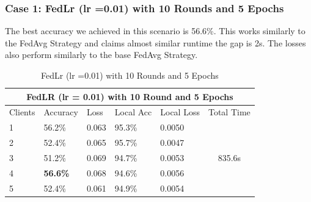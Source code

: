\documentclass[conference]{IEEEtran}
\begin{document}
 \subsubsection{Case 1: FedLr (lr =0.01) with 10 Rounds and 5 Epochs}
 
 The best accuracy we achieved in this scenario is 56.6\%. This works similarly to the FedAvg Strategy and claims almost similar runtime the gap is 2s. The losses also perform similarly to the base FedAvg Strategy. 
 \begin{table}[ht]
 	\centering
 	\caption{FedLr (lr =0.01) with 10 Rounds and 5 Epochs}
 		\begin{tabular}{|lllllc|}
 			\hline
 			\multicolumn{6}{|c|}{FedLR (lr = 0.01) with 10 Round and 5 Epochs}                                                                                                                                     \\ \hline
 			\multicolumn{1}{|l|}{Clients} & \multicolumn{1}{l|}{Accuracy}        & \multicolumn{1}{l|}{Loss}  & \multicolumn{1}{l|}{Local Acc} & \multicolumn{1}{l|}{Local Loss} & \multicolumn{1}{l|}{Total Time} \\ \hline
 			\multicolumn{1}{|l|}{1}       & \multicolumn{1}{l|}{56.2\%}          & \multicolumn{1}{l|}{0.063} & \multicolumn{1}{l|}{95.3\%}    & \multicolumn{1}{l|}{0.0050}     & \multirow{5}{*}{835.6s}         \\ \cline{1-5}
 			\multicolumn{1}{|l|}{2}       & \multicolumn{1}{l|}{52.4\%}          & \multicolumn{1}{l|}{0.065} & \multicolumn{1}{l|}{95.7\%}    & \multicolumn{1}{l|}{0.0047}     &                                 \\ \cline{1-5}
 			\multicolumn{1}{|l|}{3}       & \multicolumn{1}{l|}{51.2\%}          & \multicolumn{1}{l|}{0.069} & \multicolumn{1}{l|}{94.7\%}    & \multicolumn{1}{l|}{0.0053}     &                                 \\ \cline{1-5}
 			\multicolumn{1}{|l|}{4}       & \multicolumn{1}{l|}{\textbf{56.6\%}} & \multicolumn{1}{l|}{0.068} & \multicolumn{1}{l|}{94.6\%}    & \multicolumn{1}{l|}{0.0056}     &                                 \\ \cline{1-5}
 			\multicolumn{1}{|l|}{5}       & \multicolumn{1}{l|}{52.4\%}          & \multicolumn{1}{l|}{0.061} & \multicolumn{1}{l|}{94.9\%}    & \multicolumn{1}{l|}{0.0054}     &                                 \\ \hline
 		\end{tabular}%
 \end{table}   
 
\end{document}
